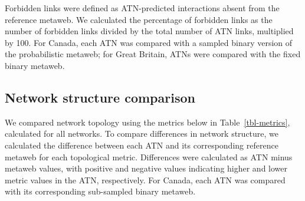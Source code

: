 \documentclass[
]{article}
\begin{document}
Forbidden links were defined as ATN-predicted interactions absent from
the reference metaweb. We calculated the percentage of forbidden links
as the number of forbidden links divided by the total number of ATN
links, multiplied by 100. For Canada, each ATN was compared with a
sampled binary version of the probabilistic metaweb; for Great Britain,
ATNs were compared with the fixed binary metaweb.

\subsection{Network structure
comparison}\label{network-structure-comparison}

We compared network topology using the metrics below in
Table~\ref{tbl-metrics}, calculated for all networks. To compare
differences in network structure, we calculated the difference between
each ATN and its corresponding reference metaweb for each topological
metric. Differences were calculated as ATN minus metaweb values, with
positive and negative values indicating higher and lower metric values
in the ATN, respectively. For Canada, each ATN was compared with its
corresponding sub-sampled binary metaweb.
\end{document}
